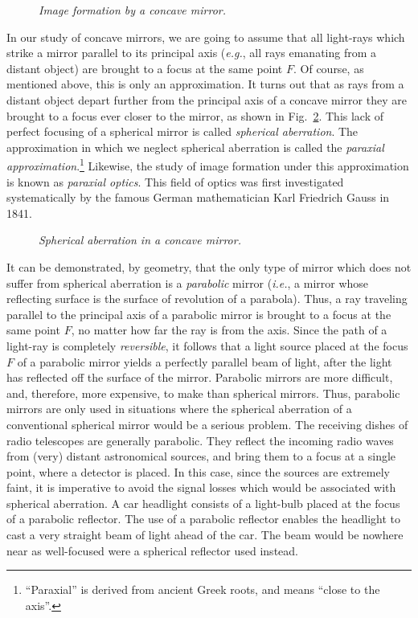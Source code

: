 \begin{figure}[h]
\epsfysize=3in
\centerline{}
\caption{\em Image formation by a concave mirror.}\label{f13.2}
\end{figure}

In our study of concave mirrors, we are going to
assume  that all light-rays which strike
a mirror parallel to its principal axis ({\em e.g.}, all rays
emanating from a distant object) are brought to a focus at the same
point $F$.
Of course, as mentioned above, this is only an approximation.
It turns out that as rays from a distant object depart further
from the principal axis of a concave mirror they are brought
to a focus ever closer to the mirror, as shown in Fig.~\ref{f13.3}. This
lack of perfect focusing of a spherical mirror is called
{\em spherical aberration}. The approximation in which
we neglect spherical aberration is called the {\em paraxial
approximation}.\footnote{``Paraxial'' is derived from
ancient Greek roots, and means ``close to the axis''.}
 Likewise, the  study of image formation under this approximation
is known as {\em paraxial optics}. This
field of optics was first investigated systematically by
the famous  German mathematician
Karl Friedrich Gauss in 1841.

\begin{figure}
\epsfysize=3in
\centerline{}
\caption{\em Spherical aberration in a concave mirror.}\label{f13.3}
\end{figure}

It can be demonstrated, by geometry, that the
only type of mirror which does not suffer from
spherical aberration is a {\em parabolic} mirror ({\em i.e.}, a mirror
whose reflecting surface is the surface of revolution of a
parabola). Thus, a ray traveling parallel to the principal
axis of a parabolic mirror is brought to a focus at the same point $F$,
no matter how far the ray is from the axis. Since the path
of a light-ray is completely {\em reversible}, it follows
that a light source placed at the focus $F$ of a parabolic
mirror yields a perfectly parallel beam of light, after the light has reflected
off the surface of the mirror. Parabolic mirrors are more
difficult, and, therefore, more expensive, to make than
spherical mirrors. Thus, parabolic mirrors are only
used in situations where the spherical aberration of
a conventional spherical mirror would be a serious problem. 
The receiving dishes of  radio telescopes are generally
parabolic. They reflect
the incoming radio waves from (very) distant astronomical
sources,  and bring them
to a focus at a single point, where a detector is placed. In this
case, since the sources are extremely faint, it is imperative to
avoid the signal losses which would be associated with spherical
aberration. A car headlight consists of a light-bulb placed at the
focus of a parabolic reflector. The use of a parabolic reflector
enables the headlight to cast a very straight beam of light ahead of
the car. The beam would be nowhere near as well-focused were a
spherical reflector used instead. 

